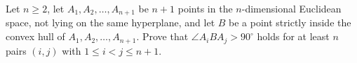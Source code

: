 \documentclass{article}
\begin{document}
\setlength{\parindent}{0pt}
Let $n\ge2$, let $A_1,A_2,\ldots,A_{n+1}$ be $n+1$ points in the $n$-dimensional Euclidean space, not lying on the same hyperplane, and let $B$ be a point strictly inside the convex hull of $A_1,A_2,\ldots,A_{n+1}$. Prove that $\angle A_iBA_j>90^\circ$ holds for at least $n$ pairs $(i,j)$ with $\displaystyle{1\le i<j\le n+1}$.
\end{document}
